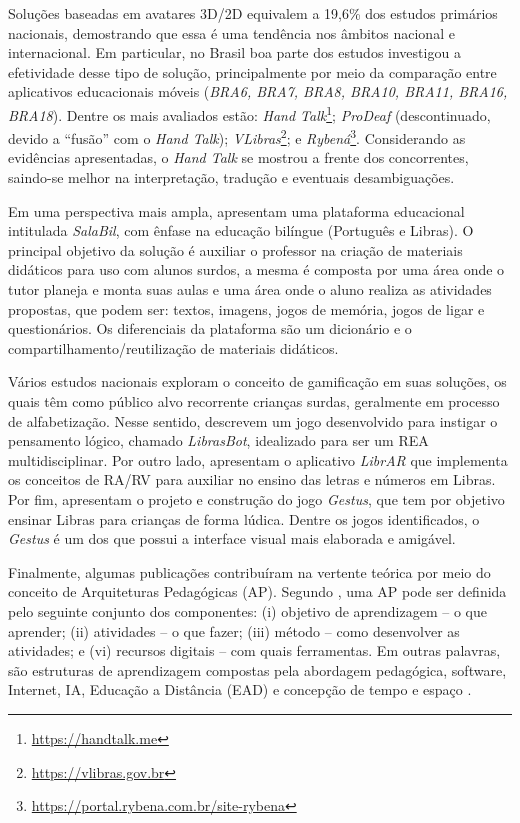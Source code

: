 Soluções baseadas em avatares 3D/2D equivalem a 19,6\% dos estudos primários nacionais, demostrando que essa é uma tendência nos âmbitos nacional e internacional. Em particular, no Brasil boa parte dos estudos investigou a efetividade desse tipo de solução, principalmente por meio da comparação entre aplicativos educacionais móveis (\textit{BRA6, BRA7, BRA8, BRA10, BRA11, BRA16, BRA18}). Dentre os mais avaliados estão: \textit{Hand Talk}\footnote{\url{https://handtalk.me}}; \textit{ProDeaf} (descontinuado, devido a ``fusão'' com o \textit{Hand Talk}); \textit{VLibras}\footnote{\url{https://vlibras.gov.br}}; e \textit{Rybená}\footnote{\url{https://portal.rybena.com.br/site-rybena}}. Considerando as evidências apresentadas, o \textit{Hand Talk} se mostrou a frente dos concorrentes, saindo-se melhor na interpretação, tradução e eventuais desambiguações.

Em uma perspectiva mais ampla,  apresentam uma plataforma educacional intitulada \textit{SalaBil}, com ênfase na educação bilíngue (Português e Libras). O principal objetivo da solução é auxiliar o professor na criação de materiais didáticos para uso com alunos surdos, a mesma é composta por uma área onde o tutor planeja e monta suas aulas e uma área onde o aluno realiza as atividades propostas, que podem ser: textos, imagens, jogos de memória, jogos de ligar e questionários. Os diferenciais da plataforma são um dicionário e o compartilhamento/reutilização de materiais didáticos.

Vários estudos nacionais exploram o conceito de gamificação em suas soluções, os quais têm como público alvo recorrente crianças surdas, geralmente em processo de alfabetização. Nesse sentido, \cite{BRA23} descrevem um jogo desenvolvido para instigar o pensamento lógico, chamado \textit{LibrasBot}, idealizado para ser um REA multidisciplinar. Por outro lado,  apresentam o aplicativo \textit{LibrAR} que implementa os conceitos de RA/RV para auxiliar no ensino das letras e números em Libras. Por fim,  apresentam o projeto e construção do jogo \textit{Gestus}, que tem por objetivo ensinar Libras para crianças de forma lúdica. Dentre os jogos identificados, o \textit{Gestus} é um dos que possui a interface visual mais elaborada e amigável.

Finalmente, algumas publicações contribuíram na vertente teórica por meio do conceito de Arquiteturas Pedagógicas (AP). Segundo , uma AP pode ser definida pelo seguinte conjunto dos componentes: (i) objetivo de aprendizagem -- o que aprender; (ii) atividades -- o que fazer; (iii) método -- como desenvolver as atividades; e (vi) recursos digitais -- com quais ferramentas. Em outras palavras, são estruturas de aprendizagem compostas pela abordagem pedagógica, software, Internet, IA, Educação a Distância (EAD) e concepção de tempo e espaço \cite{BRA27}.

